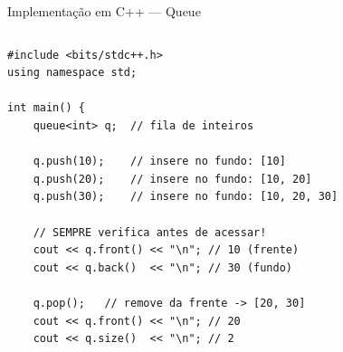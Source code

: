 \documentclass[aspectratio=169,10pt]{beamer}
\begin{document}
\begin{frame}[fragile,shrink=3]{Implementação em C++ --- Queue}
  \begin{columns}[t]
      \begin{tcolorbox}[caixaCodigo]
        \begin{lstlisting}[style=cppstyle]
#include <bits/stdc++.h>
using namespace std;

int main() {
    queue<int> q;  // fila de inteiros

    q.push(10);    // insere no fundo: [10]
    q.push(20);    // insere no fundo: [10, 20]
    q.push(30);    // insere no fundo: [10, 20, 30]

    // SEMPRE verifica antes de acessar!
    cout << q.front() << "\n"; // 10 (frente)
    cout << q.back()  << "\n"; // 30 (fundo)

    q.pop();   // remove da frente -> [20, 30]
    cout << q.front() << "\n"; // 20
    cout << q.size()  << "\n"; // 2


\end{lstlisting}
\end{tcolorbox}
\end{columns}
\end{frame}
\end{document}

